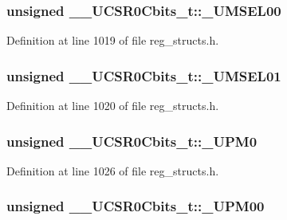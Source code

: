 \hypertarget{union_____u_c_s_r0_cbits__t_a7250c3dff70bc68742aa1ee2e1af054c}{
\subsubsection[{\+\_\+\+U\+M\+S\+E\+L00}]{\setlength{\rightskip}{0pt plus 5cm}unsigned \+\_\+\+\_\+\+U\+C\+S\+R0\+Cbits\+\_\+t\+::\+\_\+\+U\+M\+S\+E\+L00}}\label{union_____u_c_s_r0_cbits__t_a7250c3dff70bc68742aa1ee2e1af054c}


Definition at line 1019 of file reg\+\_\+structs.\+h.

\hypertarget{union_____u_c_s_r0_cbits__t_a23ae6bd96adfa06c1a04626ccba5d439}{
\subsubsection[{\+\_\+\+U\+M\+S\+E\+L01}]{\setlength{\rightskip}{0pt plus 5cm}unsigned \+\_\+\+\_\+\+U\+C\+S\+R0\+Cbits\+\_\+t\+::\+\_\+\+U\+M\+S\+E\+L01}}\label{union_____u_c_s_r0_cbits__t_a23ae6bd96adfa06c1a04626ccba5d439}


Definition at line 1020 of file reg\+\_\+structs.\+h.

\hypertarget{union_____u_c_s_r0_cbits__t_a8774696deba6747cbbd5a467ab4586ae}{
\subsubsection[{\+\_\+\+U\+P\+M0}]{\setlength{\rightskip}{0pt plus 5cm}unsigned \+\_\+\+\_\+\+U\+C\+S\+R0\+Cbits\+\_\+t\+::\+\_\+\+U\+P\+M0}}\label{union_____u_c_s_r0_cbits__t_a8774696deba6747cbbd5a467ab4586ae}


Definition at line 1026 of file reg\+\_\+structs.\+h.

\hypertarget{union_____u_c_s_r0_cbits__t_a6f5dfbdccaed2a32811af66f58e49918}{
\subsubsection[{\+\_\+\+U\+P\+M00}]{\setlength{\rightskip}{0pt plus 5cm}unsigned \+\_\+\+\_\+\+U\+C\+S\+R0\+Cbits\+\_\+t\+::\+\_\+\+U\+P\+M00}}\label{union_____u_c_s_r0_cbits__t_a6f5dfbdccaed2a32811af66f58e49918}


